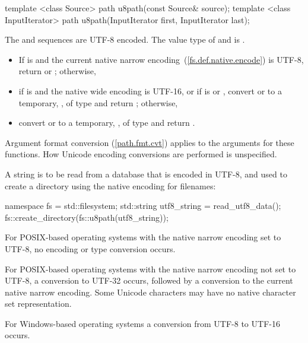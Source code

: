 %
\begin{itemdecl}
template <class Source>
  path u8path(const Source& source);
template <class InputIterator>
  path u8path(InputIterator first, InputIterator last);
\end{itemdecl}

\begin{itemdescr}
\pnum
\requires The  and 
  sequences are UTF-8 encoded. The value type of 
  and  is .

\pnum
\returns
\begin{itemize}
\item If  is  and the current native
      narrow encoding~(\ref{fs.def.native.encode}) is UTF-8,
      return  or ;
      otherwise,
\item if  is  and the
      native wide encoding is UTF-16, or
      if  is  or ,
      convert  or 
      to a temporary, , of type  and
      return ;
      otherwise,
\item convert  or 
      to a temporary, , of type  and
      return .
\end{itemize}

\pnum
\remarks Argument format conversion (\ref{path.fmt.cvt}) applies to the
  arguments for these functions. How Unicode encoding conversions are performed is
  unspecified.

\pnum
\begin{example}
A string is to be read from a database that is encoded in UTF-8, and used
    to create a directory using the native encoding for filenames:
\begin{codeblock}
namespace fs = std::filesystem;
std::string utf8_string = read_utf8_data();
fs::create_directory(fs::u8path(utf8_string));
\end{codeblock}

\pnum
For POSIX-based operating systems with the native narrow encoding set
    to UTF-8, no encoding or type conversion occurs.

\pnum
For POSIX-based operating systems with the native narrow encoding not
    set to UTF-8, a conversion to UTF-32 occurs, followed by a conversion to the
    current native narrow encoding. Some Unicode characters may have no native character
    set representation.

\pnum
For Windows-based operating systems a conversion from UTF-8 to
    UTF-16 occurs.
\end{example}
\end{itemdescr}


